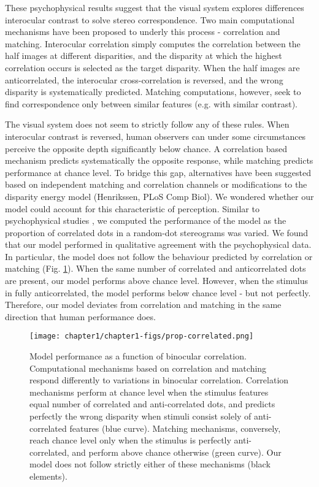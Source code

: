 These psychophysical results suggest that the visual system explores differences interocular contrast to solve stereo correspondence. Two main computational mechanisms have been proposed to underly this process - correlation and matching. Interocular correlation simply computes the correlation between the half images at different disparities, and the disparity at which the highest correlation occurs is selected as the target disparity. When the half images are anticorrelated, the interocular cross-correlation is reversed, and the wrong disparity is systematically predicted. Matching computations, however, seek to find correspondence only between similar features (e.g. with similar contrast).

The visual system does not seem to strictly follow any of these rules. When interocular contrast is reversed, human observers can under some circumstances perceive the opposite depth significantly below chance. A correlation based mechanism predicts systematically the opposite response, while matching predicts performance at chance level. To bridge this gap, alternatives have been suggested based on independent matching and correlation channels \cite{Doi:2011ku,Fujita:2016uq} or modifications to the disparity energy model (Henrikssen, PLoS Comp Biol). We wondered whether our model could account for this characteristic of perception. Similar to psychophysical studies \cite{Doi:2011ku}, we computed the performance of the model as the proportion of correlated dots in a random-dot stereograms was varied. We found that our model performed in qualitative agreement with the psychophysical data. In particular, the model does not follow the behaviour predicted by correlation or matching (Fig. \ref{fig:PropCorrelated}). When the same number of correlated and anticorrelated dots are present, our model performs above chance level. However, when the stimulus in fully anticorrelated, the model performs below chance level - but not perfectly. Therefore, our model deviates from correlation and matching in the same direction that human performance does. 

\begin{figure}
  \centering
  \texttt{[image: chapter1/chapter1-figs/prop-correlated.png]}
  \caption[Model performance as a function of binocular correlation.]{Model performance as a function of binocular correlation. Computational mechanisms based on correlation and matching respond differently to variations in binocular correlation. Correlation mechanisms perform at chance level when the stimulus features equal number of correlated and anti-correlated dots, and predicts perfectly the wrong disparity when stimuli consist solely of anti-correlated features (blue curve). Matching mechanisms, conversely, reach chance level only when the stimulus is perfectly anti-correlated, and perform above chance otherwise (green curve). Our model does not follow strictly either of these mechanisms (black elements).}
  \label{fig:PropCorrelated}
\end{figure}

